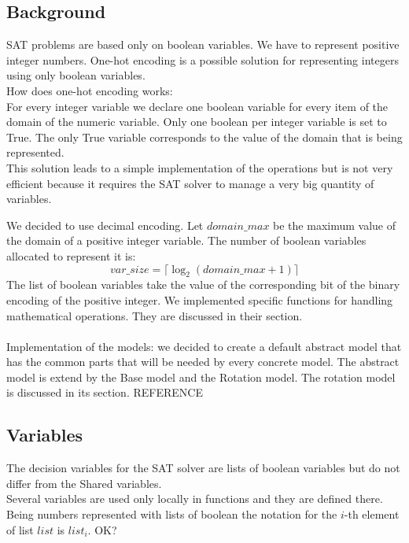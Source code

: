\subsection{Background}
    
SAT problems are based only on boolean variables. We have to represent positive integer numbers. 
One-hot encoding is a possible solution for representing integers using only boolean variables.\\
How does one-hot encoding works:\\
For every integer variable we declare one boolean variable for every item of the domain of 
the numeric variable. Only one boolean per integer variable is set to True. The only True 
variable corresponds to the value of the domain that is being represented.\\
This solution leads to a simple implementation of the operations but is not very efficient 
because it requires the SAT solver to manage a very big quantity of variables.

We decided to use decimal encoding. Let $domain\_max$ be the maximum value of the domain of 
a positive integer variable. The number of boolean variables allocated to represent it is:
\begin{equation}
    var\_size = \lceil \log_2 (domain\_max + 1)\rceil
\end{equation}
The list of boolean variables take the value of the corresponding bit of the binary encoding
of the positive integer. We implemented specific functions for handling mathematical operations.
They are discussed in their section.
\\\\
Implementation of the models:
we decided to create a default abstract model that has the common parts that will be needed by
every concrete model. The abstract model is extend by the Base model and the Rotation model. 
The rotation model is discussed in its section. REFERENCE


\subsection{Variables}
The decision variables for the SAT solver are lists of boolean variables but do not differ from
the Shared variables.\\
Several variables are used only locally in functions and they are defined there.\\
Being numbers represented with lists of boolean the notation for the $i$-th element of list 
$list$ is $list_i$.
OK?

